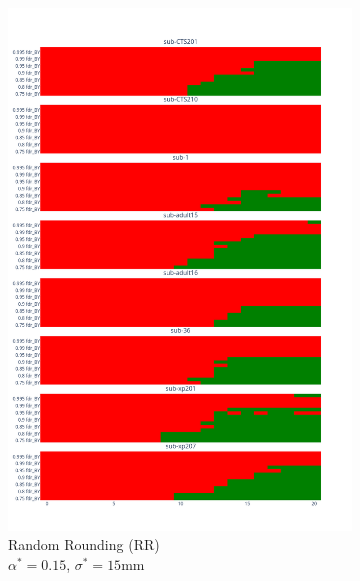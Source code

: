 \documentclass{article}
\begin{document}
\begin{figure}
    \begin{subfigure}[t]{0.3\textwidth}
         \centering
         \includegraphics[width=\textwidth]{figures/rr.png}
         \caption{\centering Random Rounding (RR)\\ $\alpha^*=0.15$, $\sigma^*=15$mm}
         \label{fig:rr}
     \end{subfigure}
    \begin{subfigure}[t]{0.3\textwidth}
         \centering

\end{subfigure}
\end{figure}
\end{document}
